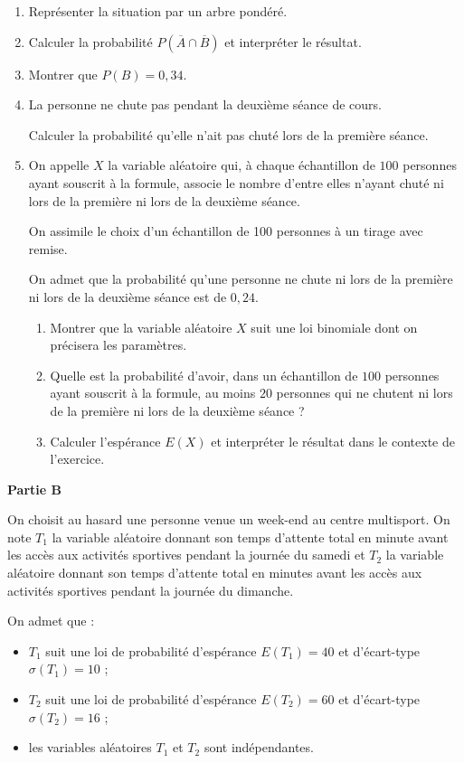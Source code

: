 \documentclass[10pt]{article}
\begin{document}
\begin{enumerate}
\item Représenter la situation par un arbre pondéré.
\item Calculer la probabilité $P \left (\overline{A} \cap \overline{B} \right )$ et interpréter le résultat.
\item Montrer que $P(B) = 0,34$.
\item La personne ne chute pas pendant la deuxième séance de cours.

Calculer la probabilité qu'elle n'ait pas chuté lors de la première séance.
\item On appelle $X$ la variable aléatoire qui, à chaque échantillon de $100$ personnes ayant souscrit à la formule, associe le nombre d'entre elles n'ayant chuté ni lors de la première ni lors de la deuxième séance.

On assimile le choix d'un échantillon de 100 personnes à un tirage avec remise.

On admet que la probabilité qu'une personne ne chute ni lors de la première ni lors de la deuxième séance est de $0,24$.
	\begin{enumerate}
		\item Montrer que la variable aléatoire $X$ suit une loi binomiale dont on précisera les paramètres.
		\item Quelle est la probabilité d'avoir, dans un échantillon de $100$ personnes ayant souscrit à la formule, au moins $20$ personnes qui ne chutent ni lors de la première ni lors de la deuxième séance ?
		\item Calculer l'espérance $E(X)$ et interpréter le résultat dans le contexte de l'exercice.
	\end{enumerate}
\end{enumerate}

\begin{center}\textbf{Partie B} \end{center}

On choisit au hasard une personne venue  un week-end au centre multisport. On note $T_1$ la variable  aléatoire donnant son temps d'attente total en minute avant les accès aux activités sportives pendant la journée du samedi et $T_2$ la variable aléatoire donnant son temps d'attente total en minutes avant les accès aux activités sportives pendant la journée du dimanche.

On admet que :

\begin{itemize}[label=$\bullet~$]
\item $T_1$ suit une loi de probabilité d'espérance $E(T_1) = 40$ et d'écart-type $\sigma(T_1) = 10$ ;
\item $T_2$ suit une loi de probabilité d'espérance $E(T_2) = 60$ et d'écart-type $\sigma(T_2) = 16$ ;
\item  les variables aléatoires $T_1$ et $T_2$ sont indépendantes.
\end{itemize}
\end{document}
